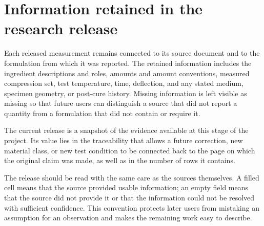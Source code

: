 \documentclass[10pt]{article}
\begin{document}
\section{Information retained in the research release}
Each released measurement remains connected to its source document and to the
formulation from which it was reported. The retained information includes the
ingredient descriptions and roles, amounts and amount conventions, measured
compression set, test temperature, time, deflection, and any stated medium,
specimen geometry, or post-cure history. Missing information is left visible
as missing so that future users can distinguish a source that did not report a
quantity from a formulation that did not contain or require it.

The current release is a snapshot of the evidence available at this stage of
the project. Its value lies in the traceability that allows a future
correction, new material class, or new test condition to be connected back to
the page on which the original claim was made, as well as in the number of rows
it contains.

The release should be read with the same care as the sources themselves. A
filled cell means that the source provided usable information; an empty field
means that the source did not provide it or that the information could not be
resolved with sufficient confidence. This convention protects later users from
mistaking an assumption for an observation and makes the remaining work easy
to describe.



\end{document}
